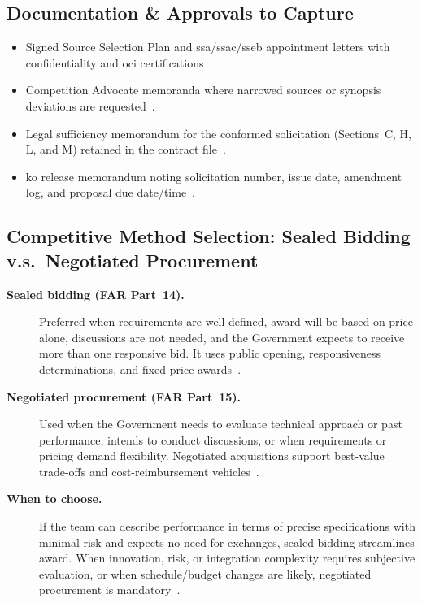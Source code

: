 \documentclass[../main.tex]{subfiles}
\begin{document}
\subsection{Documentation \& Approvals to Capture}
\begin{itemize}
	\item Signed Source Selection Plan and \ac{ssa}/\ac{ssac}/\ac{sseb} appointment letters with confidentiality and \ac{oci} certifications~\autocite{NAVSEA-Source-Selection-Guide-2022}.
	\item Competition Advocate memoranda where narrowed sources or synopsis deviations are requested~\autocite{FAR,NMCARS}.
	\item Legal sufficiency memorandum for the conformed solicitation (Sections~C, H, L, and M) retained in the contract file~\autocite{NAVSEA-Contracts-Handbook-2023}.
	\item \ac{ko} release memorandum noting solicitation number, issue date, amendment log, and proposal due date/time~\autocite{edo-3-2-2-solicitation-prep-2025}.
\end{itemize}

\subsection{Competitive Method Selection: Sealed Bidding v.s.\ Negotiated Procurement}
\begin{description}
\item[\textbf{Sealed bidding (FAR Part~14).}] Preferred when requirements are well-defined, award will be based on price alone, discussions are not needed, and the Government expects to receive more than one responsive bid. It uses public opening, responsiveness determinations, and fixed-price awards~\autocite[Part~14]{FAR}.
\item[\textbf{Negotiated procurement (FAR Part~15).}] Used when the Government needs to evaluate technical approach or past performance, intends to conduct discussions, or when requirements or pricing demand flexibility. Negotiated acquisitions support best-value trade-offs and cost-reimbursement vehicles~\autocite[Part~15]{FAR}.
	\item[\textbf{When to choose.}] If the team can describe performance in terms of precise specifications with minimal risk and expects no need for exchanges, sealed bidding streamlines award. When innovation, risk, or integration complexity requires subjective evaluation, or when schedule/budget changes are likely, negotiated procurement is mandatory~\autocite{FAR,NAVSEA-Source-Selection-Guide-2022}.
\end{description}
\end{document}
